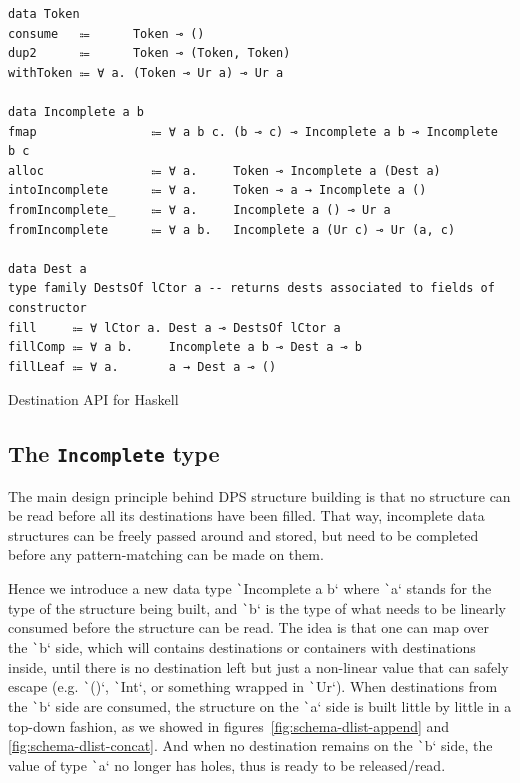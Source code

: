 \documentclass[english]{jflart}
\begin{document}
\begin{table}[t]
\small
\begin{verbatim}
data Token
consume   ⩴      Token ⊸ ()
dup2      ⩴      Token ⊸ (Token, Token)
withToken ⩴ ∀ a. (Token ⊸ Ur a) ⊸ Ur a

data Incomplete a b
fmap                ⩴ ∀ a b c. (b ⊸ c) ⊸ Incomplete a b ⊸ Incomplete b c
alloc               ⩴ ∀ a.     Token ⊸ Incomplete a (Dest a)
intoIncomplete      ⩴ ∀ a.     Token ⊸ a → Incomplete a ()
fromIncomplete_     ⩴ ∀ a.     Incomplete a () ⊸ Ur a
fromIncomplete      ⩴ ∀ a b.   Incomplete a (Ur c) ⊸ Ur (a, c)

data Dest a
type family DestsOf lCtor a -- returns dests associated to fields of constructor
fill     ⩴ ∀ lCtor a. Dest a ⊸ DestsOf lCtor a
fillComp ⩴ ∀ a b.     Incomplete a b ⊸ Dest a ⊸ b
fillLeaf ⩴ ∀ a.       a → Dest a ⊸ ()
\end{verbatim}
\caption{Destination API for Haskell}
\label{table:destination-api}
\end{table}

\subsection{The \texttt{Incomplete} type}

The main design principle behind DPS structure building is that no structure can be read before all its destinations have been filled. That way, incomplete data structures can be freely passed around and stored, but need to be completed before any pattern-matching can be made on them.

Hence we introduce a new data type \texttt`Incomplete a b` where \texttt`a` stands for the type of the structure being built, and \texttt`b` is the type of what needs to be linearly consumed before the structure can be read. The idea is that one can map over the \texttt`b` side, which will contains destinations or containers with destinations inside, until there is no destination left but just a non-linear value that can safely escape (e.g. \texttt`()`, \texttt`Int`, or something wrapped in \texttt`Ur`). When destinations from the \texttt`b` side are consumed, the structure on the \texttt`a` side is built little by little in a top-down fashion, as we showed in figures~\ref{fig:schema-dlist-append} and \ref{fig:schema-dlist-concat}. And when no destination remains on the \texttt`b` side, the value of type \texttt`a` no longer has holes, thus is ready to be released/read.
\end{document}
